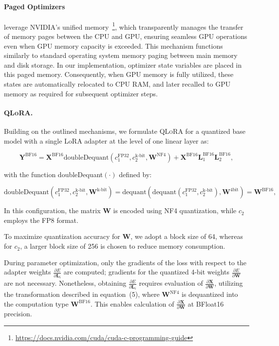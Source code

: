 \paragraph{Paged Optimizers} leverage NVIDIA's unified memory~\footnote{\tiny \url{https://docs.nvidia.com/cuda/cuda-c-programming-guide}}, which transparently manages the transfer of memory pages between the CPU and GPU, ensuring seamless GPU operations even when GPU memory capacity is exceeded. This mechanism functions similarly to standard operating system memory paging between main memory and disk storage. In our implementation, optimizer state variables are placed in this paged memory. Consequently, when GPU memory is fully utilized, these states are automatically relocated to CPU RAM, and later recalled to GPU memory as required for subsequent optimizer steps.

\paragraph{\textsc{QLoRA}.} Building on the outlined mechanisms, we formulate \textsc{QLoRA} for a quantized base model with a single LoRA adapter at the level of one linear layer as:

\begin{equation}
    \mathbf{Y}^{\text{BF16}} =  \mathbf{X}^{\text{BF16}} \text{doubleDequant}(c_1^{\text{FP32}}, c_2^{\text{k-bit}}, \mathbf{W}^{\text{NF4}}) + \mathbf{X}^{\text{BF16}}\mathbf{L}^{\text{BF16}}_1\mathbf{L}^{\text{BF16}}_2,
\end{equation}

with the function doubleDequant$(\cdot)$ defined by:

\begin{equation}
    \text{doubleDequant}(c_1^{\text{FP32}}, c_2^{\text{k-bit}}, \mathbf{W}^{\text{k-bit}}) = \text{dequant}(\text{dequant}(c_1^{\text{FP32}}, c_2^{\text{k-bit}}), \mathbf{W}^{\text{4bit}}) = \mathbf{W}^{\text{BF16}},
\end{equation}

In this configuration, the matrix $\mathbf{W}$ is encoded using NF4 quantization, while $c_2$ employs the FP8 format.

To maximize quantization accuracy for $\mathbf{W}$, we adopt a block size of 64, whereas for $c_2$, a larger block size of 256 is chosen to reduce memory consumption.

During parameter optimization, only the gradients of the loss with respect to the adapter weights $\frac{\partial E}{\partial \mathbf{L}_i}$ are computed; gradients for the quantized 4-bit weights $\frac{\partial E}{\partial \mathbf{W}}$ are not necessary. Nonetheless, obtaining $\frac{\partial E}{\partial \mathbf{L}_i}$ requires evaluation of $\frac{\partial \mathbf{X}}{\partial \mathbf{W}}$, utilizing the transformation described in equation~(5), where $\mathbf{W}^{\text{NF4}}$ is dequantized into the computation type $\mathbf{W}^{\text{BF16}}$. This enables calculation of $\frac{\partial \mathbf{X}}{\partial \mathbf{W}}$ at BFloat16 precision.

